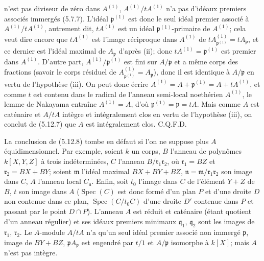 n'est pas diviseur de zéro dans $A^{(1)}$, $A^{(1)}/tA^{(1)}$ n'a pas
d'idéaux premiers associés
immergés (5.7.7). L'idéal $\mathfrak p^{(1)}$ est donc le seul idéal premier
associé à $A^{(1)}/tA^{(1)}$, autrement dit, $tA^{(1)}$ est un idéal
$\mathfrak p^{(1)}$-primaire de $A^{(1)}$; cela veut dire encore que
$tA^{(1)}$ est l'image réciproque dans $A^{(1)}$ de
$tA^{(1)}_{\mathfrak p^{(1)}}=tA_{\mathfrak p}$, et ce dernier est l'idéal
maximal de $A_{\mathfrak p}$ d'après (ii); donc
$tA^{(1)}=\mathfrak p^{(1)}$ est premier dans $A^{(1)}$. D'autre part,
$A^{(1)}/\mathfrak p^{(1)}$ est fini sur $A/\mathfrak p$ et a même corps des
fractions (savoir le corps résiduel de
$A^{(1)}_{\mathfrak p^{(1)}}=A_{\mathfrak p}$), donc il est identique à
$A/\mathfrak p$ en vertu de l'hypothèse (iii). On peut donc écrire
$A^{(1)}=A+\mathfrak p^{(1)}=A+tA^{(1)}$, et comme $t$ est contenu dans le
radical de l'anneau semi-local noethérien $A^{(1)}$, le lemme de Nakayama
entraîne $A^{(1)}=A$, d'où $\mathfrak p^{(1)}=\mathfrak p=tA$. Mais comme $A$
est caténaire et $A/tA$ intègre et intégralement clos en vertu de l'hypothèse
(iii), on conclut de (5.12.7) que $A$ est intégralement clos. C.Q.F.D.

\begin{remark}[5.12.9]
\label{IV.2.s5.12.9-fr}
La conclusion de (5.12.8) tombe en défaut si l'on ne suppose plus $A$
équidimensionnel. Par exemple, soient $k$ un corps, $B$ l'anneau de polynômes
$k[X,Y,Z]$ à trois indéterminées, $C$ l'anneau
$B/\mathfrak r_1\mathfrak r_2$, où $\mathfrak r_1=BZ$ et
$\mathfrak r_2=BX+BY$; soient $\mathfrak m$ l'idéal maximal $BX+BY+BZ$,
$\mathfrak n=\mathfrak m/\mathfrak r_1\mathfrak r_2$ son image dans $C$, $A$
l'anneau local $C_{\mathfrak n}$. Enfin, soit $t_0$ l'image dans $C$ de
l'élément $Y+Z$ de $B$, $t$ son image dans $A$
($\operatorname{Spec}(C)$ est donc formé d'un plan $P$ et d'une droite $D$ non
contenue dans ce plan, $\operatorname{Spec}(C/t_0C)$ d'une droite $D'$ contenue
dans $P$ et passant par le point $D\cap P$). L'anneau $A$ est réduit et
caténaire (étant quotient d'un anneau régulier) et ses idéaux premiers minimaux
$\mathfrak q_1$, $\mathfrak q_2$ sont les images de $\mathfrak r_1$,
$\mathfrak r_2$. Le $A$-module $A/tA$ n'a qu'un seul idéal premier associé non
immergé $\mathfrak p$, image de $BY+BZ$, $\mathfrak pA_{\mathfrak p}$ est
engendré par $t/1$ et $A/\mathfrak p$ isomorphe à $k[X]$; mais $A$ n'est pas
intègre.
\end{remark}

